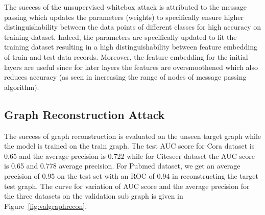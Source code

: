 \noindent The success of the unsupervised whitebox attack is attributed to the message passing which updates the parameters (weights) to specifically ensure higher distinguishability between the data points of different classes for high accuracy on training dataset.
Indeed, the parameters are specifically updated to fit the training dataset resulting in a high distinguishability between feature embedding of train and test data records.
Moreover, the feature embedding for the initial layers are useful since for later layers the features are oversmoothened which also reduces accuracy (as seen in increasing the range of nodes of message passing algorithm).




\subsection{Graph Reconstruction Attack}

The success of graph reconstruction is evaluated on the unseen target graph while the model is trained on the train graph.
The test AUC score for Cora dataset is 0.65 and the average precision is 0.722 while for Citeseer dataset the AUC score is 0.65 and 0.778 average precision.
For Pubmed dataset, we get an average precision of 0.95 on the test set with an ROC of 0.94 in reconstructing the target test graph.
The curve for variation of AUC score and the average precision for the three datasets on the validation sub graph is given in Figure~\ref{fig:valgraphrecon}.

